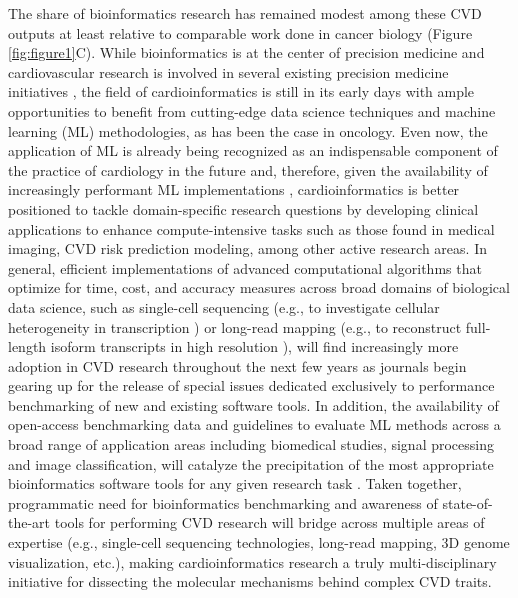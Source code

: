 \documentclass[letter]{bioinfo}
\begin{document}
The share of bioinformatics research has remained modest among these CVD outputs at least relative to comparable work done in cancer biology (Figure \ref{fig:figure1}C). While bioinformatics is at the center of precision medicine \citep{Gomez-Lopez:2017:Precision} and cardiovascular research is involved in several existing precision medicine initiatives \citep{Houser:2016:American,czbiohub:2018:Chan}, the field of cardioinformatics is still in its early days with ample opportunities to benefit from cutting-edge data science techniques and machine learning (ML) methodologies, as has been the case in oncology.  Even now, the application of ML is already being recognized as an indispensable component of the practice of cardiology in the future \citep{Shameer:2017:Translational,Shameer:2018:Machine} and, therefore, given the availability of increasingly performant ML implementations \citep{MLPerf:2018:MLPerf}, cardioinformatics is better positioned to tackle domain-specific research questions by developing clinical applications to enhance compute-intensive tasks such as those found in medical imaging, CVD risk prediction modeling, among other active research areas. In general, efficient implementations of advanced computational algorithms that optimize for time, cost, and accuracy measures across broad domains of biological data science, such as single-cell sequencing \citep{Becht:2018:Evaluation} (e.g., to investigate cellular heterogeneity in transcription \citep{Wirka:2018:Advancesa}) or long-read mapping \citep{Li:2018:Minimap2} (e.g., to reconstruct full-length isoform transcripts in high resolution \citep{Wirka:2018:Advancesa}), will find increasingly more adoption in CVD research throughout the next few years as journals begin gearing up for the release of special issues dedicated exclusively to performance benchmarking of new and existing software tools.  In addition, the availability of open-access benchmarking data and guidelines to evaluate ML methods across a broad range of application areas including biomedical studies, signal processing and image classification, will catalyze the precipitation of the most appropriate bioinformatics software tools for any given research task \citep{Olson:2017:PMLB,Weber:2018:Essential}.  Taken together, programmatic need for bioinformatics benchmarking and awareness of state-of-the-art tools for performing CVD research will bridge across multiple areas of expertise (e.g., single-cell sequencing technologies, long-read mapping, 3D genome visualization, etc.), making cardioinformatics research a truly multi-disciplinary initiative for dissecting the molecular mechanisms behind complex CVD traits.   
\end{document}
